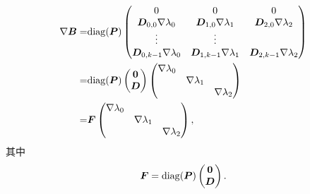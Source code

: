 \documentclass{article}
\begin{document}
\begin{equation*}
\begin{aligned}
\nabla {\boldsymbol B} = & \mathrm{diag}({\boldsymbol P})
\begin{pmatrix}
0 & 0 & 0\\
{\boldsymbol D}_{0,0} \nabla \lambda_0 & 
{\boldsymbol D}_{1,0} \nabla \lambda_1 &
{\boldsymbol D}_{2,0} \nabla \lambda_2\\
\vdots & \vdots\\
{\boldsymbol D}_{0, k-1} \nabla \lambda_0 &
{\boldsymbol D}_{1, k-1} \nabla \lambda_1 & 
{\boldsymbol D}_{2, k-1} \nabla \lambda_2 
\end{pmatrix}\\
= & \mathrm{diag}({\boldsymbol P})
\begin{pmatrix}
\mathbf 0\\
{\boldsymbol D}
\end{pmatrix}
\begin{pmatrix}
\nabla \lambda_0 \\
 & \nabla \lambda_1 \\
 & & \nabla \lambda_2\\
\end{pmatrix}\\
= & {\boldsymbol F} 
\begin{pmatrix}
\nabla \lambda_0 \\
 & \nabla \lambda_1 \\
 & & \nabla \lambda_2\\
\end{pmatrix},
\end{aligned}
\end{equation*}
其中
\begin{equation}\label{eq:F}
    {\boldsymbol F} = \mathrm{diag}({\boldsymbol P})
\begin{pmatrix} 
    \mathbf 0\\ {\boldsymbol D}
\end{pmatrix}.
\end{equation}
\end{document}
